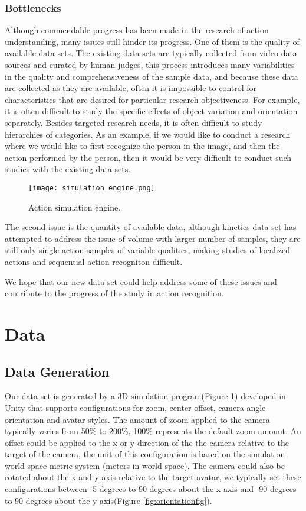 \documentclass[
	a4paper, %
	10pt, %
	unnumberedsections, %
	twoside, %
]{t0004}
\begin{document}
\subsubsection{Bottlenecks} Although commendable progress has been made in the research of action understanding, many issues still hinder its progress. One of them is the quality of available data sets. The existing data sets are typically collected from video data sources and curated by human judges, this process introduces many variabilities in the quality and comprehensiveness of the sample data, and because these data are collected as they are available, often it is impossible to control for characteristics that are desired for particular research objectiveness. For example, it is often difficult to study the specific effects of object variation and orientation separately. Besides targeted research needs, it is often difficult to study hierarchies of categories. As an example, if we would like to conduct a research where we would like to first recognize the person in the image, and then the action performed by the person, then it would be very difficult to conduct such studies with the existing data sets.

\begin{figure}
	\texttt{[image: simulation\_engine.png]}
	\caption{Action simulation engine.}
	\label{fig:simulationengine}
\end{figure}

The second issue is the quantity of available data, although kinetics data set has attempted to address the issue of volume with larger number of samples, they are still only single action samples of variable qualities, making studies of localized actions and sequential action recogniton difficult.

We hope that our new data set could help address some of these issues and contribute to the progress of the study in action recognition.

\section{Data}

\subsection{Data Generation} Our data set is generated by a 3D simulation program(Figure \ref{fig:simulationengine}) developed in Unity that supports configurations for zoom, center offset, camera angle orientation and avatar styles. The amount of zoom applied to the camera typically varies from 50\% to 200\%, 100\% represents the default zoom amount. An offset could be applied to the x or y direction of the the camera relative to the target of the camera, the unit of this configuration is based on the simulation world space metric system (meters in world space).  The camera could also be rotated about the x and y axis relative to the target avatar, we typically set these configurations between -5 degrees to 90 degrees about the x axis and -90 degrees to 90 degrees about the y axis(Figure \ref{fig:orientationfig}).
\end{document}
